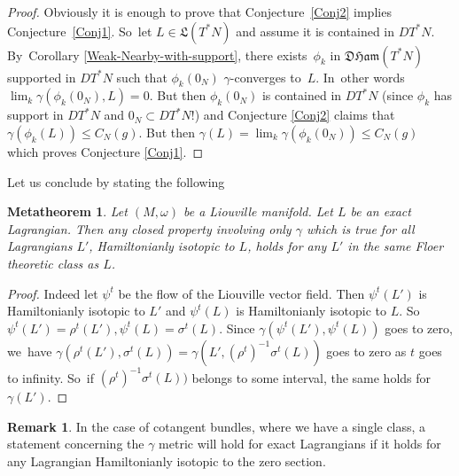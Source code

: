 \documentclass[10pt]{amsart}
\newtheorem{metatheorem}[thm]{Metatheorem}
\theoremstyle{definition}
\newtheorem{rem}[thm]{Remark}
\newcommand{\DHam}{\mathfrak{DHam}}
\begin{document}
\begin{proof}
Obviously it is enough to prove that Conjecture~\ref{Conj2} implies Conjecture~\ref{Conj1}. So~let $L\in {\mathfrak L}(T^*N)$ and assume it is contained in $DT^*N$. By~Corollary \ref{Weak-Nearby-with-support}, there exists~$\phi_k$ in $\DHam (T^*N)$ supported in $DT^*N$ such that $\phi_k(0_N)$ $\gamma$\nobreakdash-converges to~$L$. In~other words
$\lim_k \gamma(\phi_k(0_N),L)=0$. But then $\phi_k(0_N)$ is contained in $DT^*N$ (since $\phi_k$ has support in $DT^*N$ and $0_N\subset DT^*N$!) and Conjecture \ref{Conj2} claims that $\gamma(\phi_k(L))\leq C_N(g)$. But then $\gamma(L)=\lim_k \gamma(\phi_k(0_N))\leq C_N(g)$ which proves Conjecture \ref{Conj1}.
\end{proof}

Let us conclude by stating the following
\begin{metatheorem}
Let $(M,\omega)$ be a Liouville manifold. Let $L$ be an exact Lagrangian. Then any closed property involving only $\gamma$ which is true for all Lagrangians $L'$, Hamiltonianly isotopic to $L$, holds for any $L'$ in the same Floer theoretic class as $L$.
\end{metatheorem}
\begin{proof}
Indeed let $\psi^t$ be the flow of the Liouville vector field. Then $\psi^t(L')$ is Hamiltonianly isotopic to $L'$ and $\psi^t(L)$ is Hamiltonianly isotopic to $L$. So~$\psi^t(L')=\rho^t(L'), \psi^t(L)=\sigma^t(L)$. Since $\gamma (\psi^t(L'),\psi^t(L))$ goes to zero, we~have $\gamma(\rho^t(L'),\sigma^t(L))= \gamma(L', (\rho^t)^{-1}\sigma^t(L))$ goes to zero as $t$ goes to infinity. So~if
$(\rho^t)^{-1}\sigma^t(L))$ belongs to some interval, the same holds for $\gamma(L')$.
\end{proof}

\begin{rem}
In the case of cotangent bundles, where we have a single class, a statement concerning the $\gamma$ metric will hold for exact Lagrangians if it holds for any Lagrangian Hamiltonianly isotopic to the zero section.
\end{rem}
\end{document}
